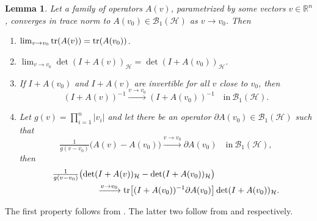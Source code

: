 \documentclass[oneside,final,11pt]{amsart}
\newtheorem{lem}[thm]{Lemma}
\theoremstyle{definition}
\newtheorem{defn}[thm]{Definition} \newtheorem{ex}[thm]{Example}
\renewcommand{\d}{\mathrm{d}}
\newcommand{\R}{\mathbb{R}}
\newcommand{\CH}{\mathcal{H}}
\newcommand{\CB}{\mathcal{B}}
\newcommand{\1}[1]{\mathbf{1}_{#1}}
\newcommand{\uptext}[1]{\text{\upshape{#1}}}
\DeclareMathOperator{\tr}{\mathop{\uptext{tr}}}
\numberwithin{equation}{section}
\begin{document}
\begin{lem}\label{lem:det}
Let a family of operators $A(v)$, parametrized by some vectors $v \in \R^n$, converges in trace norm to $A(v_0) \in \CB_1(\CH)$ as $v \to v_0$. Then
\begin{enumerate}[label=\normalfont{(\arabic*)},ref=\arabic*]
\item $\lim_{v \to v_0}\tr(A(v)) = \tr(A(v_0))$.
\item\label{it:det_continuous} $\lim_{v \to v_0}\det(I + A(v))_{\CH} = \det(I + A(v_0))_{\CH}$.
\item If $I + A(v_0)$ and $I + A(v)$ are invertible for all $v$ close to $v_0$, then
\begin{equation}
(I + A(v))^{-1} \xrightarrow{v \to v_0} (I + A(v_0))^{-1} \quad \text{in}~\CB_1(\CH).
\end{equation}
\item\label{det:deriv} Let $g (v) = \prod_{i = 1}^n |v_i|$ and let there be an operator $\partial A(v_0) \in \CB_1(\CH)$ such that
\begin{equation}
\tfrac{1}{g (v - v_0)} \bigl(A(v) - A(v_0)\bigr) \xrightarrow{v \to v_0} \partial A(v_0) \quad \text{in}~\CB_1(\CH),
\end{equation}
then
\begin{align}\label{eq:Fredholm_deriv}
\tfrac{1}{g (v - v_0)} &\bigl( \det (I + A(v))_{\CH} - \det (I + A(v_0))_{\CH}\bigr) \\
&\qquad \xrightarrow{v \to v_0} \tr \bigl[(I + A(v_0))^{-1} \partial A(v_0) \bigr] \det (I + A(v_0))_{\CH}.
\end{align}
\end{enumerate}
\end{lem}

\noindent The first property follows from \cite[Theorem~3.1]{Simon}. The latter two follow from \cite[Corollary~5.2]{Simon} and \cite[Eq.~5.1]{Simon} respectively.

\end{document}
